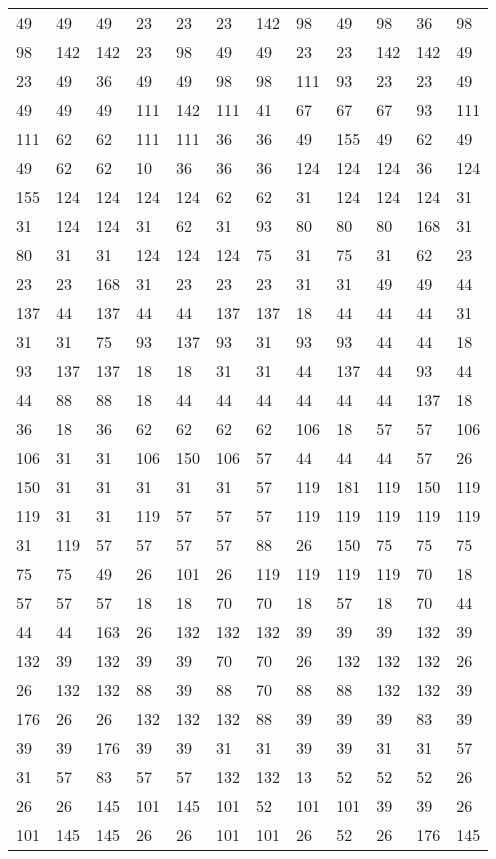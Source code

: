 \begin{longtable}{llllllllllll}
49 &49& 49 &23 &23& 23&142 &98& 49 &98 &36& 98\\
98 &142& 142 &23 &98& 49&49 &23& 23 &142 &142& 49\\
23 &49& 36 &49 &49& 98&98 &111& 93 &23 &23& 49\\
49 &49& 49 &111 &142& 111&41 &67& 67 &67 &93& 111\\
111 &62& 62 &111 &111& 36&36 &49& 155 &49 &62& 49\\
49 &62& 62 &10 &36& 36&36 &124& 124 &124 &36& 124\\
155 &124& 124 &124 &124& 62&62 &31& 124 &124 &124& 31\\
31 &124& 124 &31 &62& 31&93 &80& 80 &80 &168& 31\\
80 &31& 31 &124 &124& 124&75 &31& 75 &31 &62& 23\\
23 &23& 168 &31 &23& 23&23 &31& 31 &49 &49& 44\\
137 &44& 137 &44 &44& 137&137 &18& 44 &44 &44& 31\\
31 &31& 75 &93 &137& 93&31 &93& 93 &44 &44& 18\\
93 &137& 137 &18 &18& 31&31 &44& 137 &44 &93& 44\\
44 &88& 88 &18 &44& 44&44 &44& 44 &44 &137& 18\\
36 &18& 36 &62 &62& 62&62 &106& 18 &57 &57& 106\\
106 &31& 31 &106 &150& 106&57 &44& 44 &44 &57& 26\\
150 &31& 31 &31 &31& 31&57 &119& 181 &119 &150& 119\\
119 &31& 31 &119 &57& 57&57 &119& 119 &119 &119& 119\\
31 &119& 57 &57 &57& 57&88 &26& 150 &75 &75& 75\\
75 &75& 49 &26 &101& 26&119 &119& 119 &119 &70& 18\\
57 &57& 57 &18 &18& 70&70 &18& 57 &18 &70& 44\\
44 &44& 163 &26 &132& 132&132 &39& 39 &39 &132& 39\\
132 &39& 132 &39 &39& 70&70 &26& 132 &132 &132& 26\\
26 &132& 132 &88 &39& 88&70 &88& 88 &132 &132& 39\\
176 &26& 26 &132 &132& 132&88 &39& 39 &39 &83& 39\\
39 &39& 176 &39 &39& 31&31 &39& 39 &31 &31& 57\\
31 &57& 83 &57 &57& 132&132 &13& 52 &52 &52& 26\\
26 &26& 145 &101 &145& 101&52 &101& 101 &39 &39& 26\\
101 &145& 145 &26 &26& 101&101 &26& 52 &26 &176& 145\\

\end{longtable}
